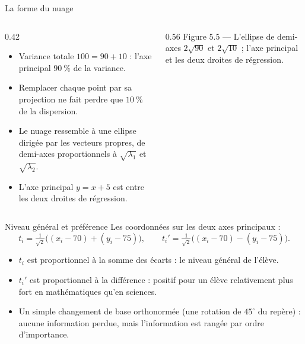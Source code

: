 \begin{frame}{La forme du nuage}
  \begin{columns}[c]
    \begin{column}{0.42\textwidth}
      \small
      \begin{itemize}
        \item Variance totale $100=90+10$ : l'axe principal
           $\SI{90}{\percent}$ de la variance.
        \item Remplacer chaque point par sa projection ne fait perdre que
          $\SI{10}{\percent}$ de la dispersion.
        \item Le nuage ressemble à une ellipse dirigée par les vecteurs
          propres, de demi-axes proportionnels à $\sqrt{\lambda_1}$ et
          $\sqrt{\lambda_2}$.
        \item L'axe principal $y=x+5$ est entre les deux droites de
          régression.
      \end{itemize}
    \end{column}
    \begin{column}{0.56\textwidth}
      \scriptsize Figure 5.5 --- L'ellipse de demi-axes $2\sqrt{90}$ et
      $2\sqrt{10}$ ; l'axe principal et les deux droites de régression.
    \end{column}
  \end{columns}
\end{frame}

\begin{frame}{Niveau général et préférence}
  Les coordonnées sur les deux axes principaux :
  \[
    t_i=\tfrac1{\sqrt2}\big((x_i-70)+(y_i-75)\big),\qquad
    t_i'=\tfrac1{\sqrt2}\big((x_i-70)-(y_i-75)\big).
  \]
  \begin{itemize}
    \item $t_i$ est proportionnel à la somme des écarts : le niveau
      général de l'élève.
    \item $t_i'$ est proportionnel à la différence : positif pour un élève
      relativement plus fort en mathématiques qu'en sciences.
    \item Un simple changement de base orthonormée (une rotation de
      $45^\circ$ du repère) : aucune information perdue, mais
      l'information est rangée par ordre d'importance.
  \end{itemize}
\end{frame}

